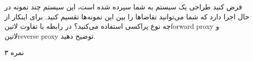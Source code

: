 \documentclass[../main.tex]{subfiles}
\begin{document}

فرض کنید طراحی یک سیستم به شما سپرده شده است، این سیستم چند نمونه در حال اجرا دارد که شما می‌توانید تقاضاها را بین این نمونه‌ها تقسیم کنید. برای اینکار از چه نوع پراکسی استفاده می‌کنید؟
در رابطه با تفاوت ‌لاتین{forward proxy} و ‌لاتین{reverse proxy} توضیح دهید.

۳ نمره
\end{document}
